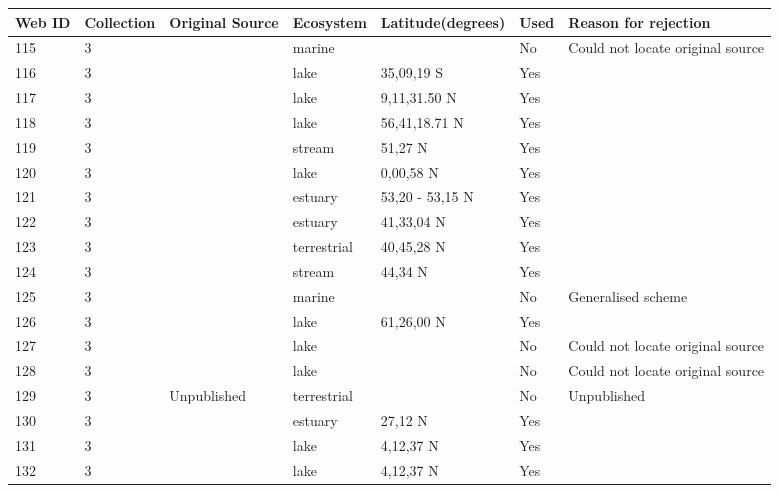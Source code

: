 \documentclass[12pt]{article}
\begin{document}
\begin{landscape}
    \begin{table}[h!]
    \centering
    {\footnotesize
      \begin{tabular}{p{2.8cm}p{1.3cm}p{5.5cm}p{2.2cm}p{2.5cm}lp{3.5cm}}
        \hline
        Web ID & Collection & Original Source & Ecosystem & Latitude(degrees) & Used  & Reason for rejection  \\
        \hline
        115   & 3 & \cite{Koepcke1952}  & marine &       & No    & Could not locate original source \\
        116   & 3 & \cite{Hurlbert1972}  & lake  & 35,09,19 S & Yes   &       \\
        117   & 3 & \cite{Zaret1973}  & lake  & 9,11,31.50 N & Yes   &       \\
        118   & 3 & \cite{Bindloss1972}  & lake  & 56,41,18.71 N & Yes   &       \\
        119   & 3 & \cite{Mann1972}  & stream & 51,27 N & Yes   &       \\
        120   & 3 & \cite{Moriarty1973}  & lake  & 0,00,58 N & Yes   &       \\
        121   & 3 & \cite{VanEs1977}  & estuary & 53,20 - 53,15 N & Yes   &       \\
        122   & 3 & \cite{Nixon1973}  & estuary & 41,33,04 N & Yes   &       \\
        123   & 3 & \cite{Harris1972}  & terrestrial & 40,45,28 N & Yes   &       \\
        124   & 3 & \cite{Collins1976}  & stream & 44,34 N & Yes   &       \\
        125   & 3 & \cite{Landry1977}  & marine &       & No    & Generalised scheme \\
        126   & 3 & \cite{Larsson1978}  & lake  & 61,26,00 N & Yes   &       \\
        127   & 3 & \cite{Beaver1979}  & lake  &       & No    & Could not locate original source \\
        128   & 3 & \cite{Beaver1979}  & lake  &       & No    & Could not locate original source \\
        129   & 3 & Unpublished & terrestrial &       & No    & Unpublished \\
        130   & 3 & \cite{Odum1975}  & estuary & 27,12 N & Yes   &       \\
        131   & 3 & \cite{Beaver1985}  & lake  & 4,12,37 N & Yes   &       \\
        132   & 3 & \cite{Beaver1985}  & lake  & 4,12,37 N & Yes   &       \\

\end{tabular}}
\end{table}
\end{landscape}
\end{document}
